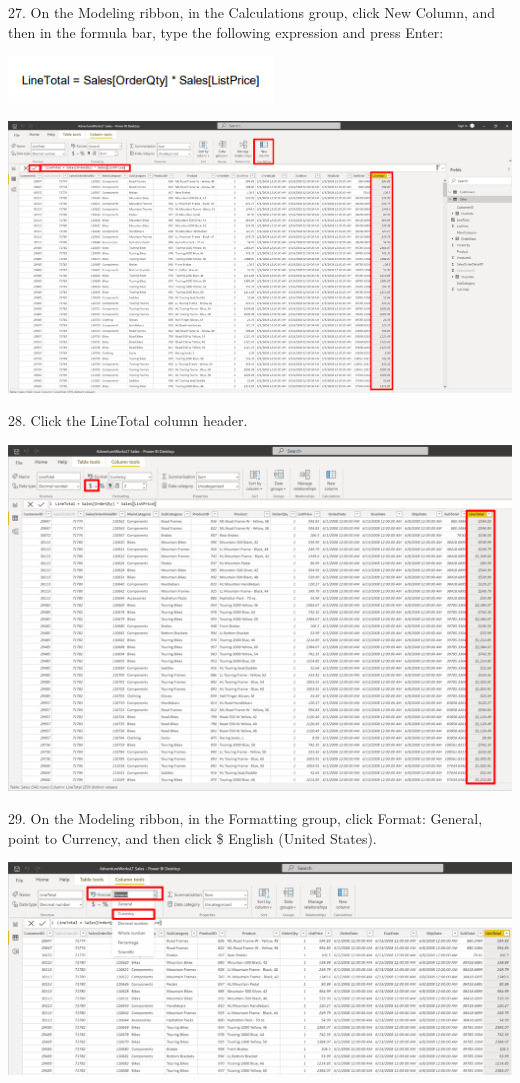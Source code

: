 \documentclass[12pt,letterpaper]{article}
\begin{document}
27. On the Modeling ribbon, in the Calculations group, click New Column, and then in the formula bar, type the
following expression and press Enter:
\begin{center}
    \includegraphics[width=7cm]{img/114.png}  
\end{center}
\begin{center}
    \includegraphics[width=17cm]{img/35.png}  
\end{center}
28. Click the LineTotal column header.
\begin{center}
    \includegraphics[width=15cm]{img/37.png}  
\end{center}
29. On the Modeling ribbon, in the Formatting group, click Format: General, point to Currency, and then click \$
English (United States).
\begin{center}
    \includegraphics[width=17.5cm]{img/36.png}
    \vspace{1cm}  
\end{center}
\end{document}
